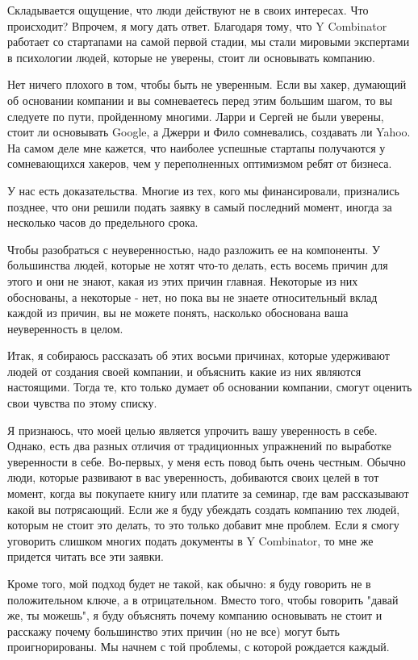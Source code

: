 \documentclass[ebook,12pt,oneside,openany]{memoir}
\begin{document}
Складывается ощущение, что люди действуют не в своих интересах. Что
происходит? Впрочем, я могу дать ответ. Благодаря тому, что Y
Combinator работает со стартапами на самой первой стадии, мы стали
мировыми экспертами в психологии людей, которые не уверены, стоит ли
основывать компанию.

Нет ничего плохого в том, чтобы быть не уверенным. Если вы хакер,
думающий об основании компании и вы сомневаетесь перед этим большим
шагом, то вы следуете по пути, пройденному многими. Ларри и Сергей не
были уверены, стоит ли основывать Google, а Джерри и Фило сомневались,
создавать ли Yahoo. На самом деле мне кажется, что наиболее успешные
стартапы получаются у сомневающихся хакеров, чем у переполненных
оптимизмом ребят от бизнеса.

У нас есть доказательства. Многие из тех, кого мы финансировали,
признались позднее, что они решили подать заявку в самый последний
момент, иногда за несколько часов до предельного срока.

Чтобы разобраться с неуверенностью, надо разложить ее на компоненты. У
большинства людей, которые не хотят что-то делать, есть восемь причин
для этого и они не знают, какая из этих причин главная. Некоторые из
них обоснованы, а некоторые - нет, но пока вы не знаете относительный
вклад каждой из причин, вы не можете понять, насколько обоснована ваша
неуверенность в целом.

Итак, я собираюсь рассказать об этих восьми причинах, которые
удерживают людей от создания своей компании, и объяснить какие из них
являются настоящими. Тогда те, кто только думает об основании
компании, смогут оценить свои чувства по этому списку.

Я признаюсь, что моей целью является упрочить вашу уверенность в себе.
Однако, есть два разных отличия от традиционных упражнений по
выработке уверенности в себе. Во-первых, у меня есть повод быть очень
честным. Обычно люди, которые развивают в вас уверенность, добиваются
своих целей в тот момент, когда вы покупаете книгу или платите за
семинар, где вам рассказывают какой вы потрясающий. Если же я буду
убеждать создать компанию тех людей, которым не стоит это делать, то
это только добавит мне проблем. Если я смогу уговорить слишком многих
подать документы в Y Combinator, то мне же придется читать все эти
заявки.

Кроме того, мой подход будет не такой, как обычно: я буду говорить не
в положительном ключе, а в отрицательном. Вместо того, чтобы говорить
"давай же, ты можешь", я буду объяснять почему компанию основывать не
стоит и расскажу почему большинство этих причин (но не все) могут быть
проигнорированы. Мы начнем с той проблемы, с которой рождается каждый.
\end{document}
